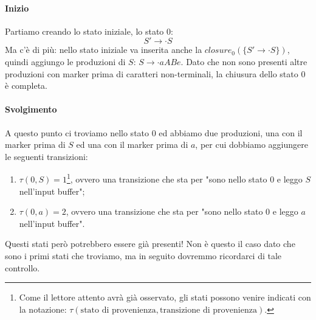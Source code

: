 \documentclass[class=book, crop=false, oneside, 12pt]{standalone}
\begin{document}
\paragraph{Inizio}
Partiamo creando lo stato iniziale, lo stato \(0\):
\begin{equation*}
    S' \to \cdot S
\end{equation*}
Ma c'è di più: nello stato iniziale va inserita anche la \(closure_0(\{ S' \to \cdot S \})\), quindi aggiungo le produzioni di \(S\): \(S \to \cdot aABe\). Dato che non sono presenti altre produzioni con marker prima di caratteri non-terminali, la chiusura dello stato \(0\) è completa.

\paragraph{Svolgimento}
A questo punto ci troviamo nello stato \(0\) ed abbiamo due produzioni, una con il marker prima di \(S\) ed una con il marker prima di \(a\), per cui dobbiamo aggiungere le seguenti transizioni:
\begin{enumerate}
    \item \(\tau (0, S) = 1\)\footnote{Come il lettore attento avrà già osservato, gli stati possono venire indicati con la notazione: \(\tau( \textrm{stato di provenienza}, \textrm{transizione di provenienza})\).}, ovvero una transizione che sta per "sono nello stato \(0\) e leggo \(S\) nell'input buffer";
    \item \(\tau (0, a) = 2\), ovvero una transizione che sta per "sono nello stato \(0\) e leggo \(a\) nell'input buffer".
\end{enumerate}
Questi stati però potrebbero essere già presenti! Non è questo il caso dato che sono i primi stati che troviamo, ma in seguito dovremmo ricordarci di tale controllo. \\
\end{document}
